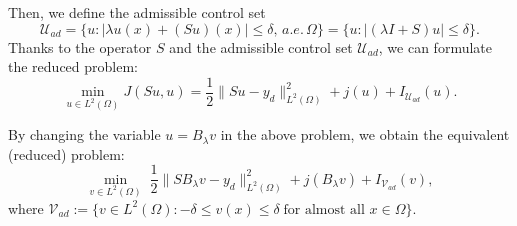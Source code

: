 \documentclass[11pt,a4paper]{amsart}
\newcommand{\om}{\Omega}
\newcommand{\norm}[1]{\lVert #1 \rVert}
\begin{document}
Then, we define the admissible control set 
\begin{equation}\label{eq:U_ad}
\mathcal{U}_{ad}=\{u: |\lambda u(x) + (S u)(x)|\leq \delta, \, a.e. \, \om \} = \{u: |(\lambda I + S)u|\leq \delta\}.
\end{equation}
Thanks to the operator $S$  and the admissible control set $\mathcal{U}_{ad}$, we can formulate the reduced problem:
\begin{equation}
\min_{u\in L^2(\om)} J(Su,u) = \frac{1}{2}\norm{Su-y_d}^2_{L^2(\om)}+j(u) + I_{\mathcal{U}_{ad}}(u).
\end{equation}

By changing the variable $u = B_\lambda v$ in the above problem, we obtain the equivalent (reduced) problem:
\begin{equation}\label{convex_lav_v}
    \displaystyle\min_{v\in L^2(\om)} \; \frac{1}{2}\norm{SB_{\lambda}v-y_d}^2_{L^2(\om)}+ j(B_\lambda v) + I_{\mathcal{V}_{ad}}(v),
\end{equation}
where $\mathcal{V}_{ad}:=\{v\in L^2(\Omega): -\delta \le v(x)\le \delta \; \mbox{for almost all } x\in \Omega\}$. 
\end{document}
